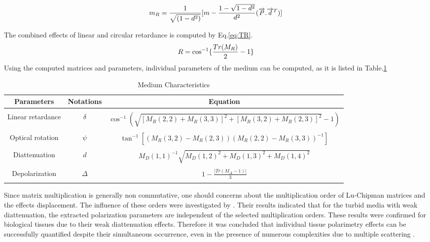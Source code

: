 \documentclass[oneside,a4,12p]{report} %
\begin{document}
	\begin{equation}\label{eq:subMR}
	\small
	m_{R} = \frac{1}{\sqrt{(1-d^{2})}}[m - \frac{1-\sqrt{1-d^{2}}}{d^{2}}(\overrightarrow{P}.\overrightarrow{d}^{T})]
	\end{equation}
	
The combined effects of linear and circular retardance is computed by Eq.\ref{eq:TR}. 
	\begin{equation}\label{eq:TR}
	\small
	R = \cos^{-1}\lbrace{\frac{Tr(M_{R})}{2}-1 \rbrace}
	\end{equation}
Using the computed matrices and parameters, individual parameters of the medium can be computed, as it is listed in Table.\ref{Tab:ParMed}\\

	\begin{table}
	\small
	\begin{center}
	\caption{Medium Characteristics}
	\begin{tabular}{|c|c|c|}
	\hline
	Parameters & Notations & Equation \\
	\hline 
	& & \\
	 Linear retardance & $\delta$ & $ \cos^{-1}(\sqrt{[M_{R}(2,2)+ M_{R}(3,3)]^{2} +[M_{R}(3,2)+ M_{R}(2,3)]^{2}}-1)$\\
	 & & \\
	Optical rotation & $\psi$ & $\tan^{-1}[(M_{R}(3,2)-M_{R}(2,3))(M_{R}(2,2)-M_{R}(3,3))^{-1}]$\\
	& & \\
	Diattenuation & $d$ & $M_{D}(1,1)^{-1}\sqrt{M_{D}(1,2)^{2}+M_{D}(1,3)^{2}+M_{D}(1,4)^{2}}$\\
	& & \\
	Depolarization & $\Delta$ & $1 - \frac{\vert Tr (M_{\Delta}-1)\vert}{3}$\\
	& & \\
	\hline   
  	\end{tabular}
  	\label{Tab:ParMed}
  	\end{center}
	\end{table}

Since matrix multiplication is generally non commutative, one should concerns about the multiplication order of Lu-Chipman matrices and the effects displacement. The influence of these orders were investigated by \cite{ghosh2010influence}. Their results indicated that for the turbid media with weak diattenuation, the extracted polarization parameters are independent of the selected multiplication orders. These results were confirmed for biological tissues due to their weak diattenuation effects. Therefore it was concluded that individual tissue polarimetry effects can be successfully quantified despite their simultaneous occurrence, even in the presence of numerous complexities due to multiple scattering \cite{ghosh2010influence}.
\end{document}
